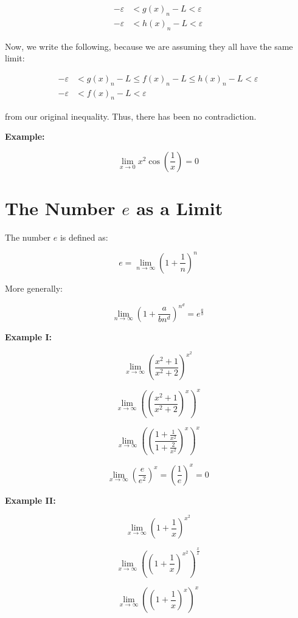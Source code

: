 \begin{align*}
    - \varepsilon &< g(x)_{n} - L < \varepsilon \\ 
    - \varepsilon &< h(x)_{n} - L < \varepsilon 
\end{align*}

Now, we write the following, because we are assuming they all have the same limit:

\begin{align*}
    - \varepsilon &< g(x)_{n} - L \le f(x)_n - L \le h(x)_{n} - L < \varepsilon \\ 
    - \varepsilon &<  f(x)_n - L < \varepsilon 
\end{align*}

from our original inequality. Thus, there has been no contradiction.

\QED

\textbf{Example:}

\[
    \lim_{x \to 0} x^2 \cos\left( \frac{1}{x} \right) = 0
\]

\section{The Number \texorpdfstring{\(e\)}{e} as a Limit}

The number \(e\) is defined as:

\[
    e = \lim_{n \to \infty} {\left(1 + \frac{1}{n} \right)}^n
\]

More generally:

\[
    \lim_{n \to \infty} {\left(1 + \frac{a}{b n^d}\right)}^{n^d} = e^{\frac{a}{b}}
\]


\textbf{Example I:}

\[
    \lim_{x \to \infty}{\left(\frac{x^2 + 1}{x^2 +2}\right)}^{x^2}
\]

\[
    \lim_{x \to \infty} {\left({\left(\frac{x^2 + 1}{x^2 +2}\right)}^{x}\right)}^x
\]

\[
    \lim_{x \to \infty} {\left({\left(\frac{1 + \frac{1}{x^2}}{1 + \frac{2}{x^2}}\right)}^{x}\right)}^x
\]

\[
    \lim_{x \to \infty} {\left(\frac{e}{e^2}\right)}^x = {\left(\frac{1}{e}\right)}^x = 0
\]

\textbf{Example II:}

\[
    \lim_{x \to \infty}\left( 1 + \frac{1}{x}\right)^{x^2}
\]

\[
    \lim_{x \to \infty} \left(\left( 1 + \frac{1}{x}\right)^{x^2}\right)^\frac{x}{x}
\]

\[
    \lim_{x \to \infty} \left(\left( 1 + \frac{1}{x}\right)^{x}\right)^x
\]


